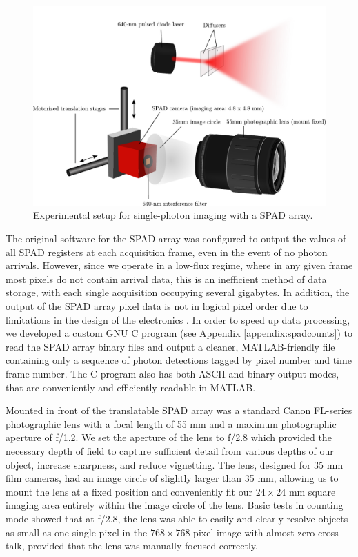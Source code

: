 \begin{figure}[h!]
\centerline{\includegraphics[width=\textwidth]{figure-first-spad-setup.pdf}}
\caption{Experimental setup for single-photon imaging with a SPAD array.}
\label{figure:first-spad-setup}
\end{figure}

The original software for the SPAD array was configured to output the values of all SPAD registers at each acquisition frame, even in the event of no photon arrivals. However, since we operate in a low-flux regime, where in any given frame most pixels do not contain arrival data, this is an inefficient method of data storage, with each single acquisition occupying several gigabytes. In addition, the output of the SPAD array pixel data is not in logical pixel order due to limitations in the design of the electronics \cite{villa-thesis}. In order to speed up data processing, we developed a custom GNU C program (see Appendix \ref{appendix:spadcounts}) to read the SPAD array binary files and output a cleaner, MATLAB-friendly file containing only a sequence of photon detections tagged by pixel number and time frame number. The C program also has both ASCII and binary output modes, that are conveniently and efficiently readable in MATLAB.

Mounted in front of the translatable SPAD array was a standard Canon FL-series photographic lens with a focal length of 55 mm and a maximum photographic aperture of f/1.2. We set the aperture of the lens to f/2.8 which provided the necessary depth of field to capture sufficient detail from various depths of our object, increase sharpness, and reduce vignetting. The lens, designed for 35 mm film cameras, had an image circle of slightly larger than 35 mm, allowing us to mount the lens at a fixed position and conveniently fit our $24\times24$ mm square imaging area entirely within the image circle of the lens. Basic tests in counting mode showed that at f/2.8, the lens was able to easily and clearly resolve objects as small as one single pixel in the $768\times768$ pixel image with almost zero cross-talk, provided that the lens was manually focused correctly.


